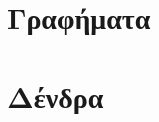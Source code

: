 \documentclass[11pt,a4paper,twoside,openany]{book}
\begin{document}
\chapter{Γραφήματα}


\chapter{Δένδρα}



\appendix
%







\end{document}
